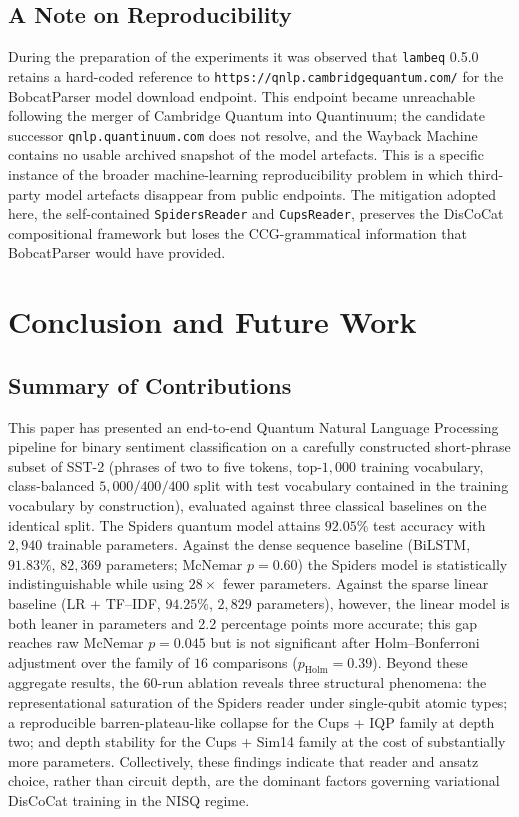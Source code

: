 \documentclass[11pt, a4paper]{article}
\begin{document}
\subsection{A Note on Reproducibility}

During the preparation of the experiments it was observed that
\texttt{lambeq} 0.5.0 retains a hard-coded reference to
\texttt{https://qnlp.cambridgequantum.com/} for the BobcatParser model
download endpoint. This endpoint became unreachable following the
merger of Cambridge Quantum into Quantinuum; the candidate successor
\texttt{qnlp.quantinuum.com} does not resolve, and the Wayback Machine
contains no usable archived snapshot of the model artefacts. This is
a specific instance of the broader machine-learning reproducibility
problem in which third-party model artefacts disappear from public
endpoints. The mitigation adopted here, the self-contained
\texttt{SpidersReader} and \texttt{CupsReader}, preserves the
DisCoCat compositional framework but loses the CCG-grammatical
information that BobcatParser would have provided.

\section{Conclusion and Future Work}
\label{sec:conclusion}

\subsection{Summary of Contributions}

This paper has presented an end-to-end Quantum Natural Language
Processing pipeline for binary sentiment classification on a
carefully constructed short-phrase subset of SST-2 (phrases of two to
five tokens, top-\(1{,}000\) training vocabulary, class-balanced
\(5{,}000/400/400\) split with test vocabulary contained in the
training vocabulary by construction), evaluated against three
classical baselines on the identical split. The Spiders quantum
model attains \(92.05\%\) test accuracy with \(2{,}940\) trainable
parameters. Against the dense sequence baseline (BiLSTM,
\(91.83\%\), \(82{,}369\) parameters; McNemar \(p = 0.60\)) the
Spiders model is statistically indistinguishable while using
\(28\times\) fewer parameters. Against the sparse linear baseline
(LR + TF--IDF, \(94.25\%\), \(2{,}829\) parameters), however, the
linear model is both leaner in parameters and 2.2 percentage points
more accurate; this gap reaches raw McNemar \(p = 0.045\) but is not
significant after Holm--Bonferroni adjustment over the family of
\(16\) comparisons
(\(p_{\text{Holm}} = 0.39\)). Beyond these aggregate
results, the 60-run ablation reveals three structural phenomena: the
representational saturation of the Spiders reader under single-qubit
atomic types; a reproducible barren-plateau-like collapse for the
Cups + IQP family at depth two; and depth stability for the
Cups + Sim14 family at the cost of substantially more parameters.
Collectively, these findings indicate that reader and ansatz choice,
rather than circuit depth, are the dominant factors governing
variational DisCoCat training in the NISQ regime.
\end{document}
